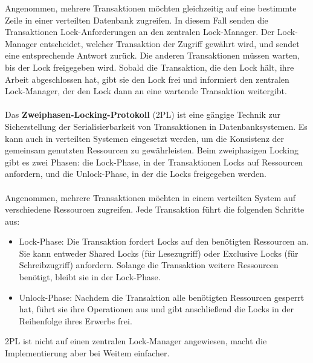 Angenommen, mehrere Transaktionen möchten gleichzeitig auf eine bestimmte Zeile in einer verteilten Datenbank zugreifen. In diesem Fall senden die Transaktionen Lock-Anforderungen an den zentralen Lock-Manager. Der Lock-Manager entscheidet, welcher Transaktion der Zugriff gewährt wird, und sendet eine entsprechende Antwort zurück. Die anderen Transaktionen müssen warten, bis der Lock freigegeben wird. Sobald die Transaktion, die den Lock hält, ihre Arbeit abgeschlossen hat, gibt sie den Lock frei und informiert den zentralen Lock-Manager, der den Lock dann an eine wartende Transaktion weitergibt.
\\\\
Das \textbf{Zweiphasen-Locking-Protokoll} (2PL) ist eine gängige Technik zur Sicherstellung der Serialisierbarkeit von Transaktionen in Datenbanksystemen. Es kann auch in verteilten Systemen eingesetzt werden, um die Konsistenz der gemeinsam genutzten Ressourcen zu gewährleisten. Beim zweiphasigen Locking gibt es zwei Phasen: die Lock-Phase, in der Transaktionen Locks auf Ressourcen anfordern, und die Unlock-Phase, in der die Locks freigegeben werden.
\\\\
Angenommen, mehrere Transaktionen möchten in einem verteilten System auf verschiedene Ressourcen zugreifen. Jede Transaktion führt die folgenden Schritte aus:
\begin{itemize}
\item Lock-Phase: Die Transaktion fordert Locks auf den benötigten Ressourcen an. Sie kann entweder Shared Locks (für Lesezugriff) oder Exclusive Locks (für Schreibzugriff) anfordern. Solange die Transaktion weitere Ressourcen benötigt, bleibt sie in der Lock-Phase.
\item Unlock-Phase: Nachdem die Transaktion alle benötigten Ressourcen gesperrt hat, führt sie ihre Operationen aus und gibt anschließend die Locks in der Reihenfolge ihres Erwerbs frei.
\end{itemize}
2PL ist nicht auf einen  zentralen Lock-Manager angewiesen, macht die Implementierung aber bei Weitem einfacher. 

